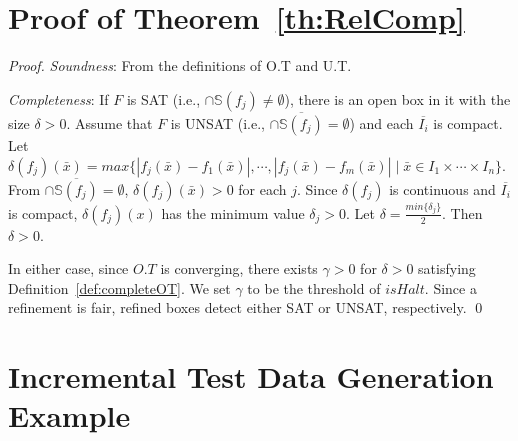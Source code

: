 \documentclass[runningheads,a4paper,oribibl]{llncs}
\begin{document}




\appendix
\section{Proof of Theorem~\ref{th:RelComp}} \label{app:Th1proof}

\begin{proof} 
\noindent
\emph{Soundness}: From the definitions of O.T and U.T.

\noindent
\emph{Completeness}: If $F$ is SAT (i.e., $\cap \mathbb{S}(f_j) \neq \emptyset$), there is 
an open box in it with the size $\delta > 0$. 
%
Assume that $F$ is UNSAT (i.e., $\cap \overline{\mathbb{S}(f_j)} = \emptyset$) and 
each $\overline{I_i}$ is compact. 
Let $\delta(f_j)(\bar{x}) = max \{ |f_j(\bar{x}) - f_1(\bar{x})|, \cdots, 
|f_j(\bar{x}) - f_m(\bar{x})| \mid \bar{x} \in I_1 \times \cdots \times I_n\}$. 
From $\cap \overline{\mathbb{S}(f_j)} = \emptyset$, $\delta(f_j)(\bar{x}) > 0$ 
for each $j$. 
Since $\delta(f_j)$ is continuous and $\overline{I_i}$ is compact, 
$\delta(f_j)(x)$ has the minimum value $\delta_j > 0$. 
Let 
$\delta = \frac{min \{ \delta_j \}}{2}$. Then $\delta > 0$. 

In either case, since $O.T$ is converging, there exists $\gamma > 0$ for $\delta > 0$ 
satisfying Definition~\ref{def:completeOT}. 
We set $\gamma$ to be the threshold of $isHalt$. Since a refinement is fair, 
refined boxes detect either SAT or UNSAT, respectively. 
\qed
\end{proof}


\section{Incremental Test Data Generation Example} \label{app:IncTestEx}
\end{document}
